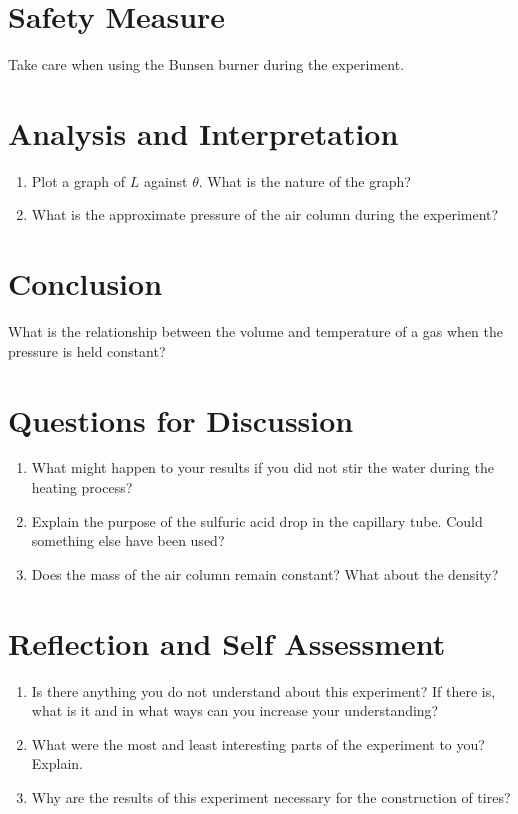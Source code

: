 \section{Safety Measure}
Take care when using the Bunsen burner during the experiment.  

\section{Analysis and Interpretation}
\begin{enumerate}
\item Plot a graph of $L$ against $\theta$. What is the nature of the graph?
\item What is the approximate pressure of the air column during the experiment?
\end{enumerate}

\section{Conclusion}
What is the relationship between the volume and temperature of a gas when the pressure is held constant?

\section{Questions for Discussion}
\begin{enumerate}
\item What might happen to your results if you did not stir the water during the heating process?
\item Explain the purpose of the sulfuric acid drop in the capillary tube. Could something else have been used?
\item Does the mass of the air column remain constant? What about the density?
\end{enumerate}

\section{Reflection and Self Assessment}
\begin{enumerate}
\item Is there anything you do not understand about this experiment? If there is, what is it and in what ways can you increase your understanding?
\item What were the most and least interesting parts of the experiment to you? Explain.
\item Why are the results of this experiment necessary for the construction of tires?
\end{enumerate}